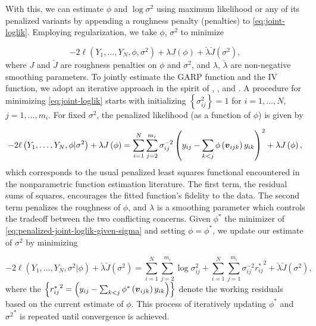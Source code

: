 \bigskip

With this, we can estimate $\phi$ and $\log\sigma^2$ using maximum likelihood or any of its penalized variants by appending a roughness penalty (penalties) to \ref{eq:joint-loglik}. Employing regularization, we take $\phi$, $\sigma^2$ to minimize 

\begin{equation} \label{eq:penalized-joint-loglik}
-2\ell\left( Y_1,\dots, Y_N, \phi, \sigma^2 \right) +    \lambda J\left( \phi \right) +  \breve{\lambda}\breve{J}\left( \sigma^2 \right),
\end{equation}
\noindent
where $J$ and $\breve{J}$ are roughness penalties on $\phi$ and $\sigma^2$, and $\lambda$, $\breve{\lambda}$ are non-negative smoothing parameters.  To jointly estimate the GARP function and the IV function, we adopt an iterative approach in the spirit of \cite{huang2006covariance}, \cite{huang2007estimation}, and \cite{pourahmadi2000maximum}. A procedure for minimizing \ref{eq:joint-loglik} starts with initializing $\left\{\sigma^2_{ij}\right\} = 1$ for $i = 1,\dots, N$, $j = 1,\dots, m_i$.  For fixed $\sigma^2$, the penalized likelihood (as a function of $\phi$) is given by

\begin{equation} \label{eq:penalized-joint-loglik-given-sigma}
-2\ell\left( Y_1,\dots, Y_N, \phi \vert \sigma^2\right) + \lambda J\left(\phi\right) = \sum_{i=1}^N \sum_{j=2}^{m_i} \sigma^{-2}_{ij}\left( y_{ij} - \sum_{k<j} \phi\left(\mbox{\boldmath $v$}_{ijk}\right) y_{ik}  \right)^2 + \lambda J\left( \phi \right),
\end{equation}
\noindent
which corresponds to the usual penalized least squares functional encountered  in the nonparametric function estimation literature. The first term, the residual sums of squares, encourages the fitted function's fidelity to the data. The second term penalizes the roughness of $\phi$, and $\lambda$ is a smoothing parameter which controls the tradeoff between the two conflicting concerns. Given $\phi^*$ the minimizer of \ref{eq:penalized-joint-loglik-given-sigma} and setting $\phi = \phi^*$, we update our estimate of $\sigma^2$ by minimizing 

\begin{equation} \label{eq:penalized-joint-loglik-given-phi}
-2\ell\left( Y_1,\dots, Y_N, \sigma^2 \vert \phi \right) + \breve{\lambda} \breve{J}\left(\sigma^2\right) = \sum_{i=1}^N \sum_{j=2}^{m_i} \log \sigma^2_{ij} + \sum_{i=1}^N \sum_{j=1}^{m_i} \sigma_{ij}^{-2} {r_{ij}^*}^2 + \breve{\lambda} \breve{J}\left(\sigma^2 \right),
\end{equation}
where the $\left\{{r_{ij}^*}^2  =\left( y_{ij} - \sum_{k<j} \phi^*\left(\mbox{\boldmath $v$}_{ijk}\right) y_{ik}  \right)\right\}$ denote the working residuals based on the current estimate of $\phi$. This process of iteratively updating $\phi^*$ and ${\sigma^2}^*$ is repeated until convergence is achieved. 
\bigskip


